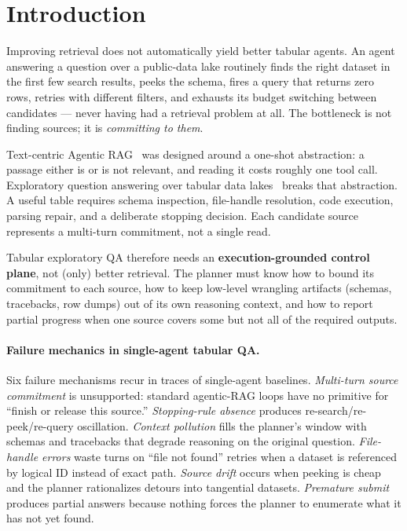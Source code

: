 \section{Introduction}

Improving retrieval does not automatically yield better tabular agents. An agent answering a question over a public-data lake routinely finds the right dataset in the first few search results, peeks the schema, fires a query that returns zero rows, retries with different filters, and exhausts its budget switching between candidates --- never having had a retrieval problem at all. The bottleneck is not finding sources; it is \emph{committing to them}.

Text-centric Agentic RAG~\cite{lewis2020rag,trivedi2023ircot,jiang2023flare,asai2024selfrag,yao2023react} was designed around a one-shot abstraction: a passage either is or is not relevant, and reading it costs roughly one tool call. Exploratory question answering over tabular data lakes~\cite{wang2026lakeqa} breaks that abstraction. A useful table requires schema inspection, file-handle resolution, code execution, parsing repair, and a deliberate stopping decision. Each candidate source represents a multi-turn commitment, not a single read.

Tabular exploratory QA therefore needs an \textbf{execution-grounded control plane}, not (only) better retrieval. The planner must know how to bound its commitment to each source, how to keep low-level wrangling artifacts (schemas, tracebacks, row dumps) out of its own reasoning context, and how to report partial progress when one source covers some but not all of the required outputs.

\paragraph{Failure mechanics in single-agent tabular QA.} Six failure mechanisms recur in traces of single-agent baselines. \emph{Multi-turn source commitment} is unsupported: standard agentic-RAG loops have no primitive for ``finish or release this source.'' \emph{Stopping-rule absence} produces re-search/re-peek/re-query oscillation. \emph{Context pollution} fills the planner's window with schemas and tracebacks that degrade reasoning on the original question. \emph{File-handle errors} waste turns on ``file not found'' retries when a dataset is referenced by logical ID instead of exact path. \emph{Source drift} occurs when peeking is cheap and the planner rationalizes detours into tangential datasets. \emph{Premature submit} produces partial answers because nothing forces the planner to enumerate what it has not yet found.

